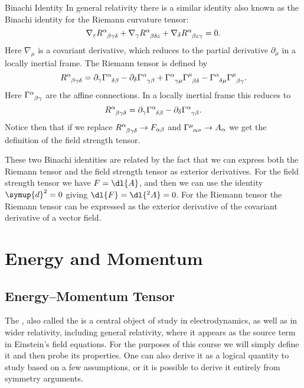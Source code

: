 \begin{app}{Binachi Identity}{}
    In general relativity there is a similar identity also known as the Binachi identity for the Riemann curvature tensor:
    \begin{equation}
        \nabla_\varepsilon \tensor{R}{^\alpha_{\beta\gamma\delta}} + \nabla_\gamma \tensor{R}{^\alpha_{\beta\delta\varepsilon}} + \nabla_\delta \tensor{R}{^\alpha_{\beta\varepsilon\gamma}} = 0.
    \end{equation}
    Here \(\nabla_\mu\) is a covariant derivative, which reduces to the partial derivative \(\partial_\mu\) in a locally inertial frame.
    The Riemann tensor is defined by
    \begin{equation}
        \tensor{R}{^\alpha_{\beta\gamma\delta}} = \partial_\gamma \tensor{\Gamma}{^\alpha_{\delta\beta}} - \partial_\delta \tensor{\Gamma}{^\alpha_{\gamma\beta}} + \tensor{\Gamma}{^\alpha_{\gamma\mu}}\tensor{\Gamma}{^\mu_{\beta\delta}} - \tensor{\Gamma}{^\alpha_{\delta\mu}}\tensor{\Gamma}{^\mu_{\beta\gamma}}.
    \end{equation}
    Here \(\tensor{\Gamma}{^\alpha_{\beta\gamma}}\) are the affine connections.
    In a locally inertial frame this reduces to
    \begin{equation}
        \tensor{R}{^\alpha_{\beta\gamma\delta}} = \partial_\gamma \tensor{\Gamma}{^\alpha_{\delta\beta}} - \partial_\delta \tensor{\Gamma}{^\alpha_{\gamma\beta}}.
    \end{equation}
    Notice then that if we replace \(\tensor{R}{^\alpha_{\beta\gamma\delta}} \to F_{\alpha\beta}\) and \(\tensor{\Gamma}{^\mu_{\alpha\sigma}} \to A_\alpha\) we get the definition of the field strength tensor.
    
    These two Binachi identities are related by the fact that we can express both the Riemann tensor and the field strength tensor as exterior derivatives.
    For the field strength tensor we have \(F = \dl{A}\), and then we can use the identity \(\symup{d}^2 = 0\) giving \(\dl{F} = \dl{^2A} = 0\).
    For the Riemann tensor the Riemann tensor can be expressed as the exterior derivative of the covariant derivative of a vector field.
\end{app}

\chapter{Energy and Momentum}
\section{Energy--Momentum Tensor}
The , also called the  is a central object of study in electrodynamics, as well as in wider relativity, including general relativity, where it appears as the source term in Einstein's field equations.
For the purposes of this course we will simply define it and then probe its properties.
One can also derive it as a logical quantity to study based on a few assumptions, or it is possible to derive it entirely from symmetry arguments.

